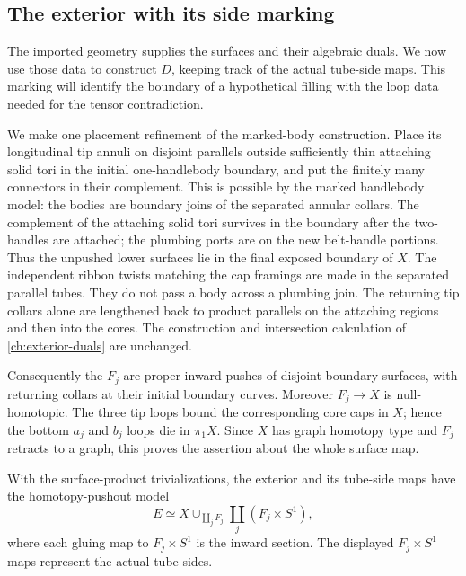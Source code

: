 \subsection{The exterior with its side marking}
\label{ch:exterior}

The imported geometry supplies the surfaces and their algebraic duals.
We now use those data to construct $D$, keeping track of the actual
tube-side maps. This marking will identify the boundary of a hypothetical
filling with the loop data needed for the tensor contradiction.

We make one placement refinement of the marked-body construction.
Place its longitudinal tip annuli on disjoint parallels outside
sufficiently thin attaching solid tori in the initial one-handlebody
boundary, and put the finitely many connectors in their complement.
This is possible by the marked handlebody model: the bodies are boundary
joins of the separated annular collars.  The complement of the attaching
solid tori survives in the boundary after the two-handles are attached;
the plumbing ports are on the new belt-handle portions.  Thus the
unpushed lower surfaces lie in the final exposed boundary of $X$.
The independent ribbon twists matching the cap framings are made in
the separated parallel tubes.  They do not pass a body across a
plumbing join.  The returning tip collars alone are lengthened back
to product parallels on the attaching regions and then into the cores.
The construction and intersection calculation of
\eqref{ch:exterior-duals} are unchanged.

Consequently the $F_j$ are proper inward pushes of disjoint boundary
surfaces, with returning collars at their initial boundary curves.
Moreover $F_j\to X$ is null-homotopic.  The three tip loops bound the
corresponding core caps in $X$; hence the bottom $a_j$ and $b_j$ loops
die in $\pi_1X$.  Since $X$ has graph homotopy type and $F_j$ retracts
to a graph, this proves the assertion about the whole surface map.

\begin{lemma}
\label{ch:exterior-model}
With the surface-product trivializations, the exterior and its tube-side
maps have the homotopy-pushout model
\[
 E\simeq X\cup_{\coprod_jF_j}\coprod_j(F_j\times S^1),
\]
where each gluing map to $F_j\times S^1$ is the inward section.
The displayed $F_j\times S^1$ maps represent the actual tube sides.
\end{lemma}

